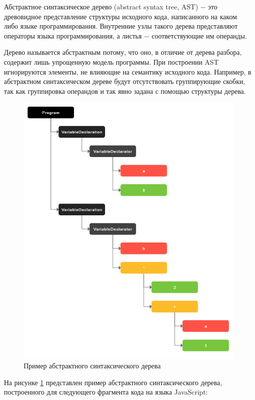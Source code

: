 \documentclass[14pt, a4paper]{article}
\begin{document}
Абстрактное синтаксическое дерево (abstract syntax tree, AST) $-$ это древовидное представление структуры исходного кода, написанного
на каком либо языке программирования. Внутренние узлы такого дерева представляют операторы языка 
программирования, а листья $-$ соответствующие им операнды.  

Дерево называется абстрактным потому, что оно, в отличие от дерева разбора, содержит лишь упрощенную модель программы. При построении
AST игнорируются элементы, не влияющие на семантику исходного кода. Например, в абстрактном синтаксическом
дереве будут отсутствовать группирующие скобки, так как группировка операндов и так явно задана с помощью структуры дерева.

\begin{figure}[h!]
  \centering
  \includegraphics[scale=0.6]{img/ast.png}
  \caption{Пример абстрактного синтаксического дерева}
  \label{ast}
\end{figure}

На рисунке \ref{ast} представлен пример абстрактного синтаксического дерева, построенного для 
следующего фрагмента кода на языка JavaScript:
\end{document}
